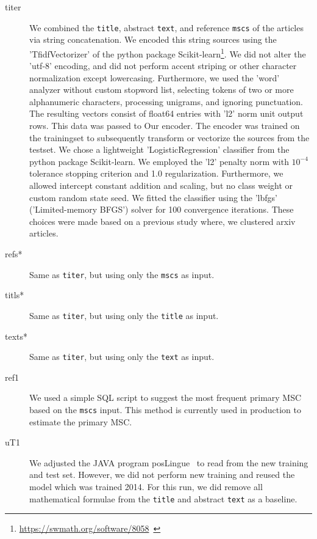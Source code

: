 \begin{description}
  \item[titer] We combined the \texttt{title}, abstract \texttt{text}, and reference \texttt{mscs} of the articles via string concatenation.
  We encoded this string sources using the 'TfidfVectorizer' of the python package Scikit-learn\footnote{\url{https://swmath.org/software/8058}~\cite{swSciKit}}. We did not alter the 'utf-8' encoding, and did not perform accent striping or other character normalization except lowercasing. Furthermore, we used the 'word' analyzer without custom stopword list, selecting tokens of two or more alphanumeric characters, processing unigrams, and ignoring punctuation. The resulting vectors consist of float64 entries with 'l2' norm unit output rows. This data was passed to Our encoder. The encoder was trained on the trainingset to subsequently transform or vectorize the sources from the testset.  We chose a lightweight 'LogisticRegression' classifier from the python package Scikit-learn. We employed the 'l2' penalty norm with $10^{-4}$ tolerance stopping criterion and 1.0 regularization. Furthermore, we allowed intercept constant addition and scaling, but no class weight or custom random state seed. We fitted the classifier using the 'lbfgs' ('Limited-memory BFGS') solver for 100 convergence iterations. These choices were made based on a previous study where, we clustered arxiv articles.
  \item[refs*] Same as \texttt{titer}, but using only the \texttt{mscs} as input.
  \item[titls*] Same as \texttt{titer}, but using only the \texttt{title} as input.
  \item[texts*] Same as \texttt{titer}, but using only the \texttt{text} as input.
  \item[ref1] We used a simple SQL script to suggest the most frequent primary MSC based on the \texttt{mscs} input. This method is currently used in production to estimate the primary MSC.
  \item[uT1] We adjusted the JAVA program posLingue~\cite{SchonebergS14} to read from the new training and test set. However, we did not perform new training and reused the model which was trained 2014. For this run, we did remove all mathematical formulae from the \texttt{title} and abstract \texttt{text} as a baseline.

\end{description}
